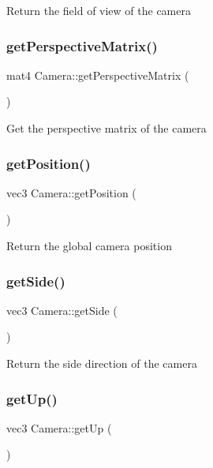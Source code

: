 Return the field of view of the camera \mbox{\label{classCamera_ad181799f11038f16667aa53bb5b68945}} 
\subsubsection{\texorpdfstring{get\+Perspective\+Matrix()}{getPerspectiveMatrix()}}
{\footnotesize\ttfamily mat4 Camera\+::get\+Perspective\+Matrix (\begin{DoxyParamCaption}{ }\end{DoxyParamCaption})}

Get the perspective matrix of the camera \mbox{\label{classCamera_a4ab9f56675dc67486c0ce95086bda56d}} 
\subsubsection{\texorpdfstring{get\+Position()}{getPosition()}}
{\footnotesize\ttfamily vec3 Camera\+::get\+Position (\begin{DoxyParamCaption}{ }\end{DoxyParamCaption})}

Return the global camera position \mbox{\label{classCamera_adbd8e27eae5a396f5f96a69a513f4cd6}} 
\subsubsection{\texorpdfstring{get\+Side()}{getSide()}}
{\footnotesize\ttfamily vec3 Camera\+::get\+Side (\begin{DoxyParamCaption}{ }\end{DoxyParamCaption})}

Return the side direction of the camera \mbox{\label{classCamera_a20bc33698379856dc3a146f4191ae7d0}} 
\subsubsection{\texorpdfstring{get\+Up()}{getUp()}}
{\footnotesize\ttfamily vec3 Camera\+::get\+Up (\begin{DoxyParamCaption}{ }\end{DoxyParamCaption})}

